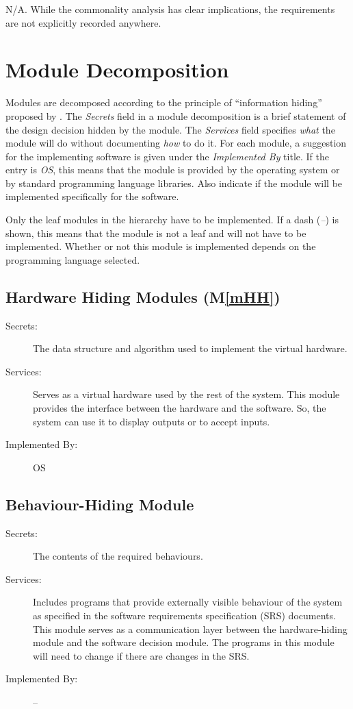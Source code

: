 \documentclass[12pt, titlepage]{article}
\newcommand{\mref}[1]{M\ref{#1}}
\begin{document}
N/A. While the commonality analysis has clear implications, the requirements 
are not explicitly recorded anywhere. 

\section{Module Decomposition} \label{SecMD}

Modules are decomposed according to the principle of ``information hiding''
proposed by \citet{ParnasEtAl1984}. The \emph{Secrets} field in a module
decomposition is a brief statement of the design decision hidden by the
module. The \emph{Services} field specifies \emph{what} the module will do
without documenting \emph{how} to do it. For each module, a suggestion for the
implementing software is given under the \emph{Implemented By} title. If the
entry is \emph{OS}, this means that the module is provided by the operating
system or by standard programming language libraries.  Also indicate if the
module will be implemented specifically for the software.

Only the leaf modules in the
hierarchy have to be implemented. If a dash (\emph{--}) is shown, this means
that the module is not a leaf and will not have to be implemented. Whether or
not this module is implemented depends on the programming language
selected.

\subsection{Hardware Hiding Modules (\mref{mHH})}

\begin{description}
\item[Secrets:]The data structure and algorithm used to implement the virtual
  hardware.
\item[Services:]Serves as a virtual hardware used by the rest of the
  system. This module provides the interface between the hardware and the
  software. So, the system can use it to display outputs or to accept inputs.
\item[Implemented By:] OS
\end{description}

\subsection{Behaviour-Hiding Module}

\begin{description}
\item[Secrets:]The contents of the required behaviours.
\item[Services:]Includes programs that provide externally visible behaviour of
  the system as specified in the software requirements specification (SRS)
  documents. This module serves as a communication layer between the
  hardware-hiding module and the software decision module. The programs in this
  module will need to change if there are changes in the SRS.
\item[Implemented By:] --
\end{description}
\end{document}
